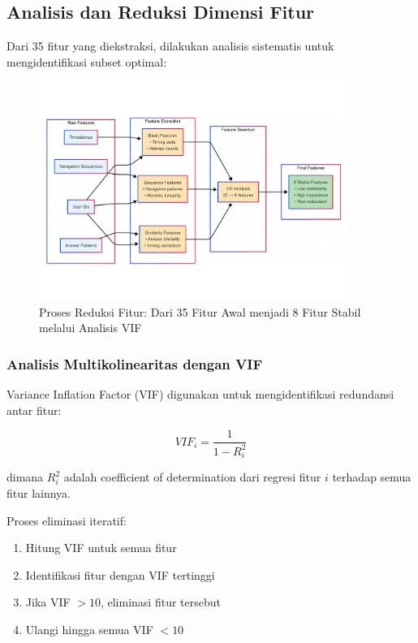 \subsection{Analisis dan Reduksi Dimensi Fitur}
\label{sec:analisisReduksiFitur}

Dari 35 fitur yang diekstraksi, dilakukan analisis sistematis untuk mengidentifikasi subset optimal:

\begin{figure}[htbp]
    \centering
    \includegraphics[width=0.9\textwidth]{figures/feature_engineering_process.pdf}
    \caption{Proses Reduksi Fitur: Dari 35 Fitur Awal menjadi 8 Fitur Stabil melalui Analisis VIF}
    \label{fig:feature_reduction_process}
\end{figure}

\subsubsection{Analisis Multikolinearitas dengan VIF}
\label{sec:analisisVIF}

Variance Inflation Factor (VIF) digunakan untuk mengidentifikasi redundansi antar fitur:

\begin{equation}
VIF_i = \frac{1}{1-R_i^2}
\end{equation}

dimana $R_i^2$ adalah coefficient of determination dari regresi fitur $i$ terhadap semua fitur lainnya.

Proses eliminasi iteratif:
\begin{enumerate}
    \item Hitung VIF untuk semua fitur
    \item Identifikasi fitur dengan VIF tertinggi
    \item Jika VIF $> 10$, eliminasi fitur tersebut
    \item Ulangi hingga semua VIF $< 10$
\end{enumerate}

